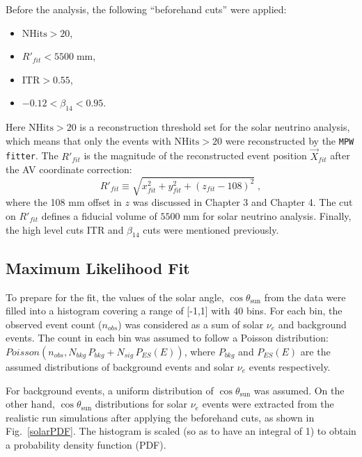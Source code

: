 Before the analysis, the following ``beforehand cuts'' were applied: 
\begin{itemize}
    \item $\mathrm{NHits}>20$\;, 
    \item $R'_{fit}<5500 \; \mathrm{mm}$\;,
    \item $\mathrm{ITR}>0.55$\;,
    \item $-0.12<\beta_{14}<0.95$\;. 
\end{itemize}
Here $\mathrm{NHits}>20$ is a reconstruction threshold set for the solar neutrino analysis, which means that only the events with $\mathrm{NHits}>20$ were reconstructed by the \texttt{MPW fitter}. The $R'_{fit}$ is the magnitude of the reconstructed event position $\vec{X}_{fit}$ after the AV coordinate correction:
\begin{equation*}
R'_{fit}\equiv\sqrt{x^2_{fit}+y^2_{fit}+(z_{fit}-108)^2}\;, 
\end{equation*}
where the 108 mm offset in $z$ was discussed in Chapter 3 and Chapter 4. The cut on $R'_{fit}$ defines a fiducial volume of $5500$ mm for solar neutrino analysis. Finally, the high level cuts ITR and $\beta_{14}$ cuts were mentioned previously.

\subsection{Maximum Likelihood Fit}\label{sect:poisson_fit}

To prepare for the fit, the values of the solar angle, $\cos\theta_\mathrm{sun}$ from the data were filled into a histogram covering a range of [-1,1] with 40 bins. For each bin, the observed event count ($n_{obs}$) was considered as a sum of solar $\nu_e$ and background events. The count in each bin was assumed to follow a Poisson distribution: $Poisson(n_{obs}, N_{bkg} \, P_{bkg}+N_{sig} \, P_{ES}(E))$, where $P_{bkg}$ and $P_{ES}(E)$ are the assumed distributions of background events and solar $\nu_e$ events respectively.

For background events, a uniform distribution of $\cos\theta_\mathrm{sun}$ was assumed. On the other hand, $\cos\theta_\mathrm{sun}$ distributions for solar $\nu_e$ events were extracted from the realistic run simulations after applying the beforehand cuts, as shown in Fig.~\ref{solarPDF}. The histogram is scaled (so as to have an integral of 1) to obtain a probability density function (PDF).

